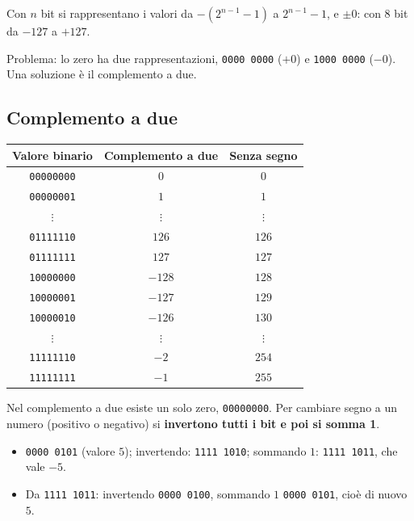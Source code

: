 \documentclass[11pt,a4paper]{article}
\begin{document}
Con $n$ bit si rappresentano i valori da $-(2^{n-1} - 1)$ a $2^{n-1} - 1$, e
$\pm 0$: con 8 bit da $-127$ a $+127$.

\begin{osservazione}
Problema: lo zero ha due rappresentazioni, \texttt{0000 0000} ($+0$) e
\texttt{1000 0000} ($-0$). Una soluzione è il complemento a due.
\end{osservazione}

\subsection{Complemento a due}

\begin{center}
\begin{tabular}{ccc}
\toprule
\textbf{Valore binario} & \textbf{Complemento a due} & \textbf{Senza segno} \\
\midrule
\texttt{00000000} & $0$    & $0$   \\
\texttt{00000001} & $1$    & $1$   \\
$\vdots$ & $\vdots$ & $\vdots$ \\
\texttt{01111110} & $126$  & $126$ \\
\texttt{01111111} & $127$  & $127$ \\
\texttt{10000000} & $-128$ & $128$ \\
\texttt{10000001} & $-127$ & $129$ \\
\texttt{10000010} & $-126$ & $130$ \\
$\vdots$ & $\vdots$ & $\vdots$ \\
\texttt{11111110} & $-2$   & $254$ \\
\texttt{11111111} & $-1$   & $255$ \\
\bottomrule
\end{tabular}
\end{center}

Nel complemento a due esiste un solo zero, \texttt{00000000}. Per cambiare segno a
un numero (positivo o negativo) si \textbf{invertono tutti i bit e poi si somma 1}.

\begin{esempio}
\begin{itemize}
    \item \texttt{0000 0101} (valore $5$); invertendo: \texttt{1111 1010};
          sommando $1$: \texttt{1111 1011}, che vale $-5$.
    \item Da \texttt{1111 1011}: invertendo \texttt{0000 0100}, sommando $1$
          \texttt{0000 0101}, cioè di nuovo $5$.
\end{itemize}
\end{esempio}
\end{document}
